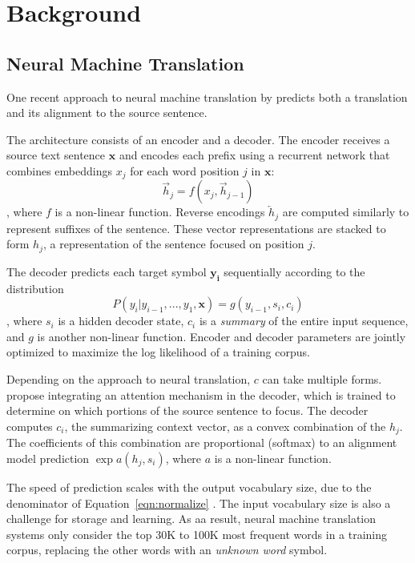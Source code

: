 \section{Background}
\label{sec:background}

\subsection{Neural Machine Translation}
One recent approach to neural machine translation by  predicts both a translation
and its alignment to the source sentence.

The architecture consists of an encoder and a decoder. The encoder receives a
source text sentence $\mathbf{x}$ and encodes each prefix using a recurrent
network that combines embeddings $x_j$ for each word position $j$ in
$\mathbf{x}$:
\begin{equation}
\overrightarrow{h}_{j} = f(x_{j}, \overrightarrow{h}_{j-1})
\end{equation},
where $f$ is a non-linear function. Reverse encodings $\overleftarrow{h}_j$
are computed similarly to represent suffixes of the sentence. These vector
representations are stacked to form $h_j$, a representation of the sentence
focused on position $j$.

The decoder predicts each target symbol $\mathbf{y_i}$ sequentially according
to the distribution
\begin{equation}
P(y_{i} | y_{i-1}, ..., y_{1}, \mathbf{x}) = g(y_{i-1}, s_i, c_i)
\label{eqn:normalize}
\end{equation},
where $s_i$ is a hidden decoder state, $c_i$ is a \emph{summary} of the entire
input sequence, and $g$ is another non-linear function. Encoder and decoder
parameters are jointly optimized to maximize the log likelihood of a training
corpus.

Depending on the approach to neural translation, $c$ can take multiple forms.
 propose integrating an attention mechanism
in the decoder, which is trained to determine on which portions of the source
sentence to focus. The decoder computes $c_{i}$, the summarizing context
vector, as a convex combination of the $h_{j}$. The coefficients of this
combination are proportional (softmax) to an alignment model prediction $\exp a(h_j,
s_i)$, where $a$ is a non-linear function.

The speed of prediction scales with the output vocabulary size, due to the
denominator of Equation~\ref{eqn:normalize} \cite{journals/corr/JeanCMB14}. The
input vocabulary size is also a challenge for storage and learning. As aa
result, neural machine translation systems only consider the top 30K to 100K
most frequent words in a training corpus, replacing the other words with an
\emph{unknown word} symbol.

